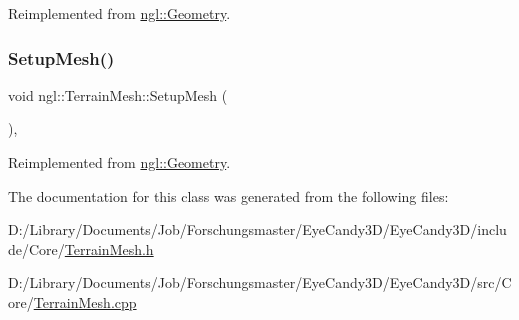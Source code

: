 Reimplemented from \mbox{\hyperlink{classngl_1_1_geometry_a494c5a8210176ae8cf02c5398e4f4bde}{ngl\+::\+Geometry}}.

\mbox{\label{classngl_1_1_terrain_mesh_aa473949dcd4dca706fbb04363ef075ed}} 
\subsubsection{\texorpdfstring{Setup\+Mesh()}{SetupMesh()}}
{\footnotesize\ttfamily void ngl\+::\+Terrain\+Mesh\+::\+Setup\+Mesh (\begin{DoxyParamCaption}{ }\end{DoxyParamCaption})\hspace{0.3cm}{\ttfamily [protected]}, {\ttfamily [virtual]}}



Reimplemented from \mbox{\hyperlink{classngl_1_1_geometry_a4da93f38cd1dd53dad93bbb7b998f1c3}{ngl\+::\+Geometry}}.



The documentation for this class was generated from the following files\+:\begin{DoxyCompactItemize}
\item 
D\+:/\+Library/\+Documents/\+Job/\+Forschungsmaster/\+Eye\+Candy3\+D/\+Eye\+Candy3\+D/include/\+Core/\mbox{\hyperlink{_terrain_mesh_8h}{Terrain\+Mesh.\+h}}\item 
D\+:/\+Library/\+Documents/\+Job/\+Forschungsmaster/\+Eye\+Candy3\+D/\+Eye\+Candy3\+D/src/\+Core/\mbox{\hyperlink{_terrain_mesh_8cpp}{Terrain\+Mesh.\+cpp}}\end{DoxyCompactItemize}
